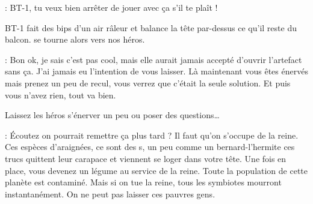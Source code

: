 \begin{quotebox}
\noindent\textbf{}: BT-1, tu veux bien arrêter de jouer avec ça s’il te plaît !
\end{quotebox}
BT-1 fait des bips d’un air râleur et balance la tête par-dessus ce qu’il reste du balcon.  se tourne alors vers nos héros.
\begin{quotebox}
\noindent\textbf{}: Bon ok, je sais c’est pas cool, mais elle aurait jamais accepté d’ouvrir l’artefact sans ça. J’ai jamais eu l’intention de vous laisser. Là maintenant vous êtes énervés mais prenez un peu de recul, vous verrez que c’était la seule solution. Et puis vous n’avez rien, tout va bien.
\end{quotebox}
Laissez les héros s’énerver un peu ou poser des questions\dots
\begin{quotebox}
\noindent\textbf{}: \'Ecoutez on pourrait remettre ça plus tard ? Il faut qu’on s’occupe de la reine. Ces espèces d’araignées, ce sont des s, un peu comme un bernard-l’hermite ces trucs quittent leur carapace et viennent se loger dans votre tête. Une fois en place, vous devenez un légume au service de la reine. Toute la population de cette planète est contaminé. Mais si on tue la reine, tous les symbiotes mourront instantanément. On ne peut pas laisser ces pauvres gens.
\end{quotebox}